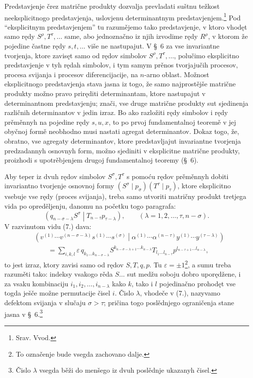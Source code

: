 \documentclass[11pt]{article}
\newcommand{\pair}[2]{\left(#1\middle|#2\right)}
\newcommand{\eps}{\varepsilon}
\begin{document}
Predstavjenje črez matrične produkty dozvalja prevladati suštnu težkost neeksplicitnogo predstavjenja, uslovjenu determinantnym predstavjenjem.\footnote{Srav. Vvod.} Pod ``eksplicitnym predstavjenjem'' tu razumějemo tako predstavjenje, v ktoro vhodęt samo rędy $S^\rho,T^\tau,\ldots$ same, abo jednoznačno iz njih izvodime rędy $R^\rho$, v ktorom že pojedine častne rędy $s,t,\ldots$ više ne nastupajut. V \S\ 6 za vse invariantne tvorjenja, ktore zavisęt samo od rędov simbolov $S^\rho,T^\tau,\ldots$, polučimo eksplicitno predstavjenje v tyh rędah simbolov, i tym samym prěnos tvorjajučih procesov, procesa svijanja i procesov diferencijacije, na $n$-arno oblast. Možnost eksplicitnogo predstavjenja stava jasna iz togo, že samo najprostějše matrične produkty možno pravo priręditi determinantam, ktore nastupajut v determinantnom predstavjenju; znači, vse druge matrične produkty sut sjedinenja različnih determinantov v jedin izraz. Bo ako razložiti rędy simbolov i rędy prěměnnyh na pojedine rędy $s,u,x$, to po prvoj fundamentalnoj teoremě v jej obyčnoj formě neobhodno musi nastati agregat determinantov. Dokaz togo, že, obratno, vse agregaty determinantov, ktore predstavljajut invariantne tvorjenja predzadannyh osnovnyh form, možno sjediniti v eksplicitne matrične produkty, proizhodi s upotrěbjenjem drugoj fundamentalnoj teoremy (\S\ 6).

Aby teper iz dvuh rędov simbolov $S^\sigma,T^\tau$ s pomoću rędov prěměnnyh dobiti invariantno tvorjenje osnovnoj formy $(S^\sigma\mid p_\sigma)(T^\tau\mid p_\tau)$, ktore eksplicitno vsebuje vse rędy (proces svijanja), treba samo utvoriti matričny produkt tretjega vida po opreděljenju, danomu na početku togo paragrafa:
\begin{equation}
 \pair{q_{n-\sigma-\lambda}S^\sigma}{T_{n-\tau}p_{\tau-\lambda}},
 \qquad (\lambda=1,2,\ldots,\tau,n-\sigma).
\tag{7}
\end{equation}
V razvinutom vidu (7.) dava:
\begin{equation}
\begin{aligned}
&\pair{v^{(1)}\cdots v^{(n-\sigma-\lambda)}s^{(1)}\cdots s^{(\sigma)}}
       {\alpha^{(1)}\cdots\alpha^{(n-\tau)}y^{(1)}\cdots y^{(\tau-\lambda)}} \\
&\qquad =\sum_{i,k,l}\eps\,q_{k_1\ldots k_{n-\sigma-\lambda}}
 S^{k_{n-\sigma-\lambda+1}\ldots k_{n-\lambda}}
 T_{l_1\ldots l_{n-\tau}}
 p^{l_{n-\tau+1}\ldots l_{n-\lambda}},
\end{aligned}
\tag{8}
\end{equation}
to jest izraz, ktory zavisi samo od rędov $S,T,q,p$. Tu $\eps=\pm1$\footnote{To označenje bude vsegda zachovano dalje.}, a sumu treba razuměti tako: indeksy vsakogo rěda $S\ldots$ sut medžu soboju dobro uporędžene, i za vsaku kombinaciju $i_1,i_2,\ldots,i_{n-\lambda}$ kako $k$, tako i $l$ pojedinačno prohodęt vse togda ješče možne permutacije čisel $i$. Čislo $\lambda$, vhodeče v (7.), nazyvamo defektom svijanja v slučaju $\sigma>\tau$; pričina togo poslědnjego ograničenja stane jasna v \S\ 6.\footnote{Čislo $\lambda$ vsegda běži do menšego iz dvuh poslědnje ukazanyh čisel.}
\end{document}
